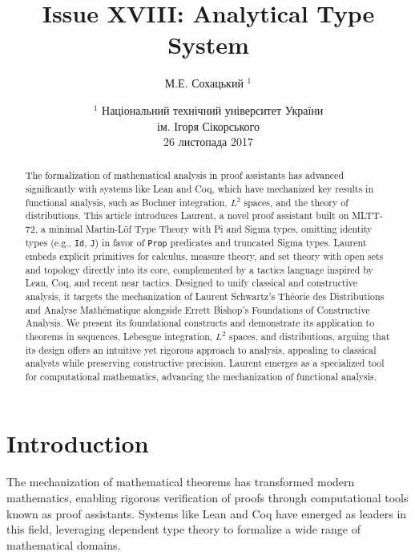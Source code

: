 \documentclass{article}
\begin{document}
\author { М.Е. Сохацький $^1$ }
\title { Issue XVIII: Analytical Type System }
\date{ \small $^1$ Національний технічний університет України \\
       ім. Ігоря Сікорського \\
       26 листопада 2017 }
\maketitle

\begin{abstract}

  The formalization of mathematical analysis in proof assistants has
  advanced significantly with systems like Lean and Coq, which have
  mechanized key results in functional analysis, such as Bochner
  integration, $L^2$ spaces, and the theory of distributions. This
  article introduces Laurent, a novel proof assistant built on MLTT-72,
  a minimal Martin-Löf Type Theory with Pi and Sigma types, omitting
  identity types (e.g., \texttt{Id}, \texttt{J}) in favor of
  \texttt{Prop} predicates and truncated Sigma types. Laurent
  embeds explicit primitives for calculus, measure theory, and set
  theory with open sets and topology directly into its core,
  complemented by a tactics language inspired by Lean, Coq, and
  recent near tactics. Designed to unify classical and constructive
  analysis, it targets the mechanization of Laurent Schwartz’s Théorie
  des Distributions and Analyse Mathématique alongside Errett Bishop’s
  Foundations of Constructive Analysis. We present its foundational
  constructs and demonstrate its application to theorems in sequences,
  Lebesgue integration, $L^2$ spaces, and distributions, arguing that
  its design offers an intuitive yet rigorous approach to analysis,
  appealing to classical analysts while preserving constructive
  precision. Laurent emerges as a specialized tool for computational
  mathematics, advancing the mechanization of functional analysis.

\end{abstract}

\section{Introduction}
The mechanization of mathematical theorems has transformed modern mathematics,
enabling rigorous verification of proofs through computational tools known as
proof assistants. Systems like Lean and Coq have emerged as leaders in this field,
leveraging dependent type theory to formalize a wide range of mathematical domains.
\end{document}
